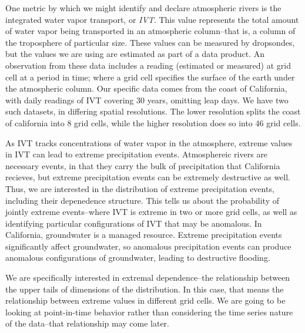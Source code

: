One metric by which we might identify and declare atmospheric rivers is the integrated water vapor
  transport, or \emph{IVT}.  This value represents the total amount of water
  vapor being transported in an atmospheric column--that is, a column of the troposphere of particular
  size. These values can be measured by dropsondes, but the values we are using are estimated as part
  of a data product.  An observation from these data includes a reading (estimated
  or measured) at grid cell at a period in time; where a grid cell specifies the surface of the
  earth under the atmospheric column.  Our specific data comes from the coast of California,
  with daily readings of IVT covering 30 years, omitting leap days.  We have two such datasets, in
  differing spatial resolutions.  The lower resolution splits the coast of california into 8 grid
  cells, while the higher resolution does so into 46 grid cells.

As IVT tracks concentrations of water vapor in the atmosphere, extreme values in IVT can lead to
  extreme precipitation events.  Atmosphereic rivers are necessary events, in that they carry the
  bulk of precipitation that California recieves, but extreme precipitation events can be extremely
  destructive as well.  Thus, we are interested in the distribution of extreme precipitation events,
  including their depenedence structure.  This tells us about the probability of jointly extreme
  events--where IVT is extreme in two or more grid cells, as well as identifying particular
  configurations of IVT that may be anomalous.  In California, groundwater is a managed resource.
  Extreme precipitation events significantly affect groundwater, so anomalous precipitation events
  can produce anomalous configurations of groundwater, leading to destructive flooding.

We are specifically interested in extremal dependence--the relationship between the upper tails of
  dimensions of the distribution.  In this case, that means the relationship between extreme values
  in different grid cells.  We are going to be looking at point-in-time behavior rather than
  considering the time series nature of the data--that relationship may come later.

